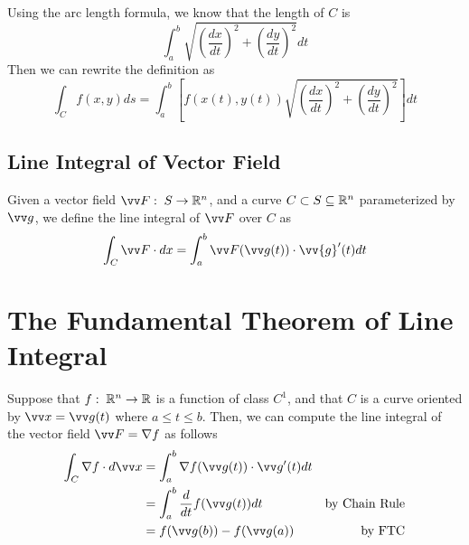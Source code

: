 Using the arc length formula, we know that the length of $C$ is
$$
\int_a^b \sqrt{\left( \frac{dx}{dt} \right)^2 + \left( \frac{dy}{dt} \right)^2} dt
$$
Then we can rewrite the definition as
$$
\int_C f(x,y) ds = \int_a^b \left[ f(x(t),y(t)) \sqrt{\left( \frac{dx}{dt} \right)^2 + \left( \frac{dy}{dt} \right)^2} \right] dt
$$

\subsection{Line Integral of Vector Field}

\begin{definition}
Given a vector field $\vv F:\; S \to \R^n$, and a curve $C \subset S \subseteq {\mathbb R}^n$ parameterized by $\vv g$, we define the line integral of $\vv F$ over $C$ as
$$
\int_C \vv F \cdot dx = \int_a^b  \vv F(\vv g(t)) \cdot \vv{g}'(t) dt
$$
\end{definition}

\section{The Fundamental Theorem of Line Integral}

\begin{theorem}
Suppose that $f:\; {\mathbb R}^n  \to {\mathbb R}$ is a function of class $C^1$, and that $C$ is a curve oriented by $\vv x = \vv g(t)$ where $a \leq t \leq b$. Then, we can compute the line integral of the vector field $\vv F = \nabla f$ as follows
$$
\begin{aligned}
\int_C \nabla f \cdot d\vv x &= \int_a^b  \nabla f(\vv g(t)) \cdot \vv g'(t)dt \\
&= \int_a^b \frac{d}{dt} f(\vv g(t)) dt & \text{by Chain Rule} \\
&= f(\vv g(b)) - f(\vv g(a)) & \text{by FTC}
\end{aligned}
$$
\end{theorem}

